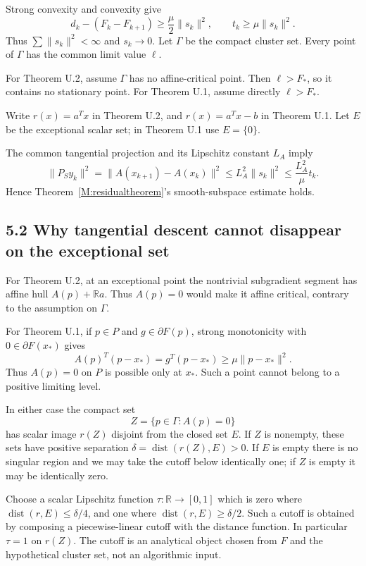 \documentclass[10pt,oneside,openany]{book}
\theoremstyle{remark}\newtheorem{remark}{Remark}[chapter]
\begin{document}
Strong convexity and convexity give \[
 d_k-(F_k-F_{k+1})\ge\frac\mu2\|s_k\|^2,
 \qquad t_k\ge\mu\|s_k\|^2.\tag{U.10}
\] Thus \(\sum\|s_k\|^2<\infty\) and \(s_k\to0\). Let \(\Gamma\) be the
compact cluster set. Every point of \(\Gamma\) has the common limit
value \(\ell\).

For Theorem U.2, assume \(\Gamma\) has no affine-critical point. Then
\(\ell>F_*\), so it contains no stationary point. For Theorem U.1, assume
directly \(\ell>F_*\).

Write \(r(x)=a^Tx\) in Theorem U.2, and \(r(x)=a^Tx-b\) in Theorem U.1. Let
\(E\) be the exceptional scalar set; in Theorem U.1 use \(E=\{0\}\).

The common tangential projection and its Lipschitz constant \(L_A\)
imply \[
 \|P_S y_k\|^2=\|A(x_{k+1})-A(x_k)\|^2
 \le L_A^2\|s_k\|^2\le\frac{L_A^2}{\mu}t_k.\tag{U.11}
\] Hence Theorem~\ref{M:residualtheorem}'s smooth-subspace estimate holds.

\subsection{5.2 Why tangential descent cannot disappear on the
exceptional
set}\label{U:why-tangential-descent-cannot-disappear-on-the-exceptional-set}

For Theorem U.2, at an exceptional point the nontrivial subgradient
segment has affine hull \(A(p)+\mathbb R a\). Thus \(A(p)=0\) would make
it affine critical, contrary to the assumption on \(\Gamma\).

For Theorem U.1, if \(p\in P\) and \(g\in\partial F(p)\), strong
monotonicity with \(0\in\partial F(x_*)\) gives \[
 A(p)^T(p-x_*)=g^T(p-x_*)\ge\mu\|p-x_*\|^2.
\] Thus \(A(p)=0\) on \(P\) is possible only at \(x_*\). Such a point
cannot belong to a positive limiting level.

In either case the compact set \[
 Z=\{p\in\Gamma:A(p)=0\}
\] has scalar image \(r(Z)\) disjoint from the closed set \(E\). If
\(Z\) is nonempty, these sets have positive separation
\(\delta=\operatorname{dist}(r(Z),E)>0\). If \(E\) is empty there is no
singular region and we may take the cutoff below identically one; if
\(Z\) is empty it may be identically zero.

Choose a scalar Lipschitz function \(\tau:\mathbb R\to[0,1]\) which is
zero where \(\operatorname{dist}(r,E)\le\delta/4\), and one where
\(\operatorname{dist}(r,E)\ge\delta/2\). Such a cutoff is obtained by
composing a piecewise-linear cutoff with the distance function. In
particular \(\tau=1\) on \(r(Z)\). The cutoff is an analytical object
chosen from \(F\) and the hypothetical cluster set, not an algorithmic
input.
\end{document}
